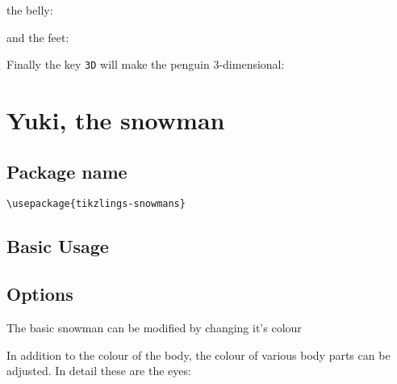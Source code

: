 \documentclass[parskip=half]{scrartcl}
\begin{document}
the belly:

\begin{tcblisting}{}
\penguin[belly=red]
\end{tcblisting}

and the feet:

\begin{tcblisting}{}
\penguin[feet=red]
\end{tcblisting}

Finally the key \lstinline|3D| will make the penguin 3-dimensional:

\begin{tcblisting}{}
\penguin[3D]
\end{tcblisting}



\clearpage
\section[Snowman]{Yuki, the snowman}

\subsection{Package name}

\begin{tcolorbox}[lower separated=false, lefthand width=.8\linewidth]
\vspace*{0.5cm}
\lstinline|\usepackage{tikzlings-snowmans}|
\vspace*{0.5cm}
\end{tcolorbox}

\subsection{Basic Usage}

\begin{tcblisting}{}
\snowman
\end{tcblisting}

\subsection{Options}

The basic snowman can be modified by changing it's colour

\begin{tcblisting}{}
\snowman[body=SteelBlue]
\end{tcblisting}

In addition to the colour of the body, the colour of various body parts can be adjusted. In detail these are the eyes:
\end{document}
